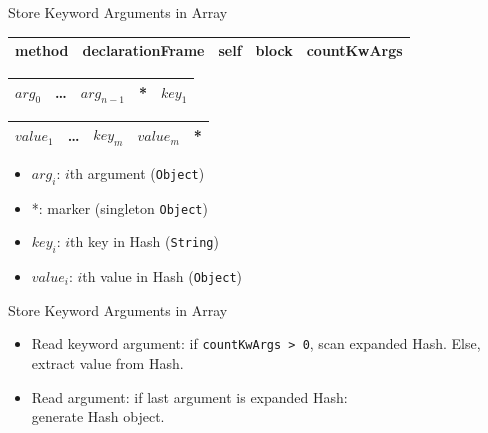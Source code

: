 \documentclass[xcolor=dvipsname,handout]{beamer} %
\begin{document}
\begin{frame}{Store Keyword Arguments in Array}
\begin{table}
\begin{tabular}{|c|c|c|c|c|}
\hline
method & declarationFrame & self & block & countKwArgs  \\ 
\hline
\end{tabular}
\end{table}
\begin{table}
\begin{tabular}{|c|c|c|c|c|}
\hline
 $\mathit{arg}_0$ & \ldots & $\mathit{arg}_{n-1}$ & *  & $\mathit{key}_1$\\
\hline
\end{tabular}
\end{table}

\begin{table}
\begin{tabular}{|c|c|c|c|c|}
\hline
 $\mathit{value}_1$ & \ldots  & $\mathit{key}_m$ & $\mathit{value}_m$ & * \\
\hline
\end{tabular}
\end{table}

\begin{itemize}
    \item $\mathit{arg}_i$: $i$th argument (\lstinline{Object})
    \item *: marker (singleton \lstinline{Object})
    \item $\mathit{key}_i$: $i$th key in Hash (\lstinline{String})
    \item $\mathit{value}_i$: $i$th value in Hash (\lstinline{Object})
\end{itemize}
\end{frame}

\begin{frame}{Store Keyword Arguments in Array}
\begin{itemize}
    \item Read keyword argument: if \lstinline{countKwArgs > 0}, scan expanded Hash. Else, extract value from Hash.
    \item Read argument: if last argument is expanded Hash: \\ generate Hash object.
\end{itemize}
\end{frame}
\end{document}
